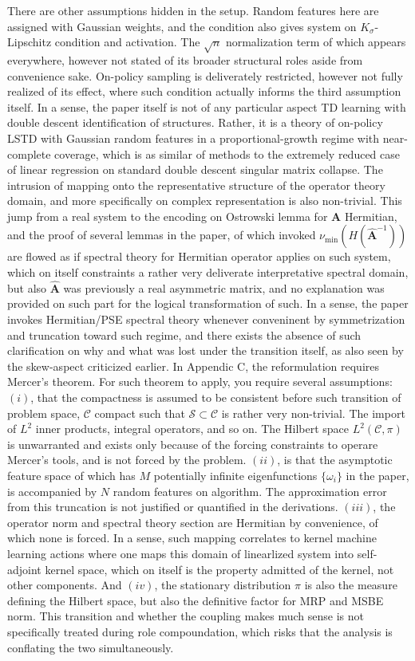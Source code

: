 There are other assumptions hidden in the setup. Random features here are assigned with Gaussian weights, and the condition also gives system on $K_{\sigma}$-Lipschitz condition and activation. The $\sqrt{n}$ normalization term of which appears everywhere, however not stated of its broader structural roles aside from convenience sake. On-policy sampling is deliverately restricted, however not fully realized of its effect, where such condition actually informs the third assumption itself. In a sense, the paper itself is not of any particular aspect TD learning with double descent identification of structures. Rather, it is a theory of on-policy LSTD with Gaussian random features in a proportional-growth regime with near-complete coverage, which is as similar of methods to the extremely reduced case of linear regression on standard double descent singular matrix collapse. The intrusion of mapping onto the representative structure of the operator theory domain, and more specifically on complex representation is also non-trivial. This jump from a real system to the encoding on Ostrowski lemma for $\bm{A}$ Hermitian, and the proof of several lemmas in the paper, of which invoked $\nu_{\min}(H(\hat{\bm{A}}^{-1}))$ are flowed as if spectral theory for Hermitian operator applies on such system, which on itself constraints a rather very deliverate interpretative spectral domain, but also $\hat{\bm{A}}$ was previously a real asymmetric matrix, and no explanation was provided on such part for the logical transformation of such. In a sense, the paper invokes Hermitian/PSE spectral theory whenever conveninent by symmetrization and truncation toward such regime, and there exists the absence of such clarification on why and what was lost under the transition itself, as also seen by the skew-aspect criticized earlier. In Appendic C, the reformulation requires Mercer's theorem. For such theorem to apply, you require several assumptions: $(i)$, that the compactness is assumed to be consistent before such transition of problem space, $\mathcal{C}$ compact such that $\mathcal{S}\subset \mathcal{C}$ is rather very non-trivial. The import of $L^{2}$ inner products, integral operators, and so on. The Hilbert space $L^{2}(\mathcal{C},\pi)$ is unwarranted and exists only because of the forcing constraints to operare Mercer's tools, and is not forced by the problem. $(ii)$, is that the asymptotic feature space of which has $M$ potentially infinite eigenfunctions $\{\omega_{i}\}$ in the paper, is accompanied by $N$ random features on algorithm. The approximation error from this truncation is not justified or quantified in the derivations. $(iii)$, the operator norm and spectral theory section are Hermitian by convenience, of which none is forced. In a sense, such mapping correlates to kernel machine learning actions where one maps this domain of linearlized system into self-adjoint kernel space, which on itself is the property admitted of the kernel, not other components. And $(iv)$, the stationary distribution $\pi$ is also the measure defining the Hilbert space, but also the definitive factor for MRP and MSBE norm. This transition and whether the coupling makes much sense is not specifically treated during role compoundation, which risks that the analysis is conflating the two simultaneously. 

